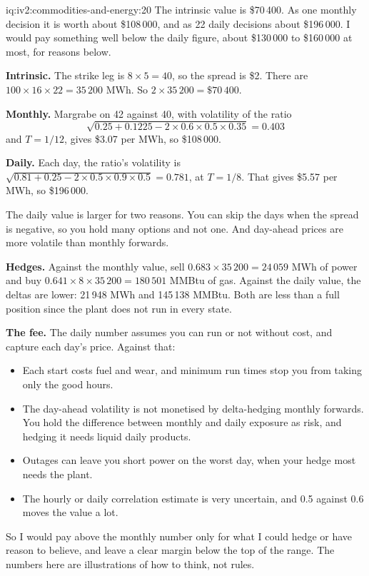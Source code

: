 \begin{solution}{iq:iv2:commodities-and-energy:20}
The intrinsic value is \$70\,400. As one monthly decision it is worth about \$108\,000, and as 22 daily decisions about \$196\,000. I would pay something well below the daily figure, about \$130\,000 to \$160\,000 at most, for reasons below.

\textbf{Intrinsic.} The strike leg is $8 \times 5 = 40$, so the spread is \$2. There are $100 \times 16 \times 22 = 35\,200$ MWh. So $2 \times 35\,200 = \$70\,400$.

\textbf{Monthly.} Margrabe on 42 against 40, with volatility of the ratio
\[
\sqrt{0.25 + 0.1225 - 2 \times 0.6 \times 0.5 \times 0.35} = 0.403
\]
and $T = 1/12$, gives \$3.07 per MWh, so \$108\,000.

\textbf{Daily.} Each day, the ratio's volatility is $\sqrt{0.81 + 0.25 - 2 \times 0.5 \times 0.9 \times 0.5} = 0.781$, at $T = 1/8$. That gives \$5.57 per MWh, so \$196\,000.

The daily value is larger for two reasons. You can skip the days when the spread is negative, so you hold many options and not one. And day-ahead prices are more volatile than monthly forwards.

\textbf{Hedges.} Against the monthly value, sell $0.683 \times 35\,200 = 24\,059$ MWh of power and buy $0.641 \times 8 \times 35\,200 = 180\,501$ MMBtu of gas. Against the daily value, the deltas are lower: 21\,948 MWh and 145\,138 MMBtu. Both are less than a full position since the plant does not run in every state.

\textbf{The fee.} The daily number assumes you can run or not without cost, and capture each day's price. Against that:
\begin{itemize}
\item Each start costs fuel and wear, and minimum run times stop you from taking only the good hours.
\item The day-ahead volatility is not monetised by delta-hedging monthly forwards. You hold the difference between monthly and daily exposure as risk, and hedging it needs liquid daily products.
\item Outages can leave you short power on the worst day, when your hedge most needs the plant.
\item The hourly or daily correlation estimate is very uncertain, and 0.5 against 0.6 moves the value a lot.
\end{itemize}
So I would pay above the monthly number only for what I could hedge or have reason to believe, and leave a clear margin below the top of the range. The numbers here are illustrations of how to think, not rules.


\end{solution}

